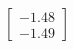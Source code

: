 \documentclass[preview]{standalone}
\begin{document}
\begin{align*}
\begin{bmatrix} -1.48 \\ -1.49 \end{bmatrix}
\end{align*}
\end{document}
